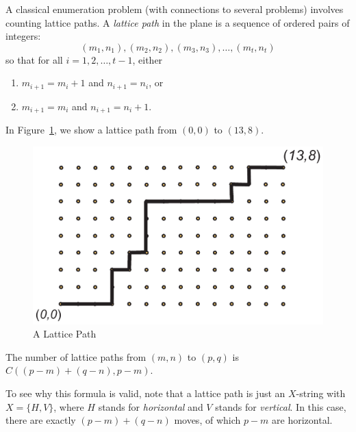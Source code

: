 A classical enumeration problem (with connections to several problems)
involves counting lattice paths. A \textit{lattice path} in the plane
is a sequence of ordered pairs of integers:
\[
(m_1,n_1), (m_2,n_2), (m_3,n_3),\dots,(m_t,n_t)
\]
so that for all $i=1,2,\dots,t-1$, either
\begin{enumerate}
\item  $m_{i+1}=m_{i}+1$ and $n_{i+1}=n_i$, or
\item  $m_{i+1}=m_i$ and $n_{i+1}=n_{i}+1$.
\end{enumerate}

In Figure~\ref{fig:latticepath}, we show a lattice path from
$(0,0)$ to $(13,8)$.

\begin{figure}
\begin{center}
\includegraphics[scale=.4]{string-figs/3012-fig22}
\caption{A Lattice Path}
\label{fig:latticepath}
\end{center}
\end{figure}

\begin{example}  The number of lattice paths from $(m,n)$ to
$(p,q)$ is $C((p-m)+(q-n),p-m)$.

To see why this formula is valid, note that a lattice 
path is just an $X$-string with
$X=\{H,V\}$, where $H$ stands for \textit{horizontal} and $V$ stands
for \textit{vertical}.  In this case, there are exactly $(p-m)+(q-n)$
moves, of which $p-m$ are horizontal.
\end{example}

